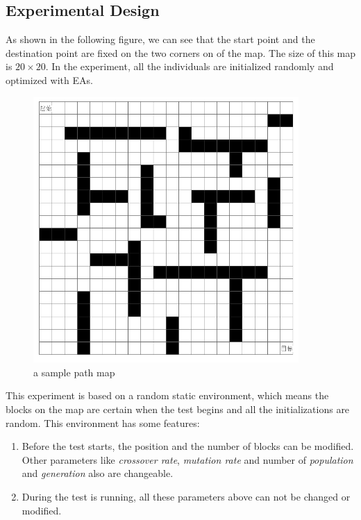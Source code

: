 \documentclass[a4paper, 11pt]{article}
\begin{document}
\subsection{Experimental Design}
As shown in the following figure, we can see that the start point and the destination point are fixed on the two corners on of the map. The size of this map is $20\times 20$. In the experiment, all the individuals are initialized randomly and optimized with EAs.
\begin{figure}[htb]
\includegraphics[width=0.9\textwidth]{images/20131122155512.png}
\caption{a sample path map}
\label{fig:path}
\end{figure}
This experiment is based on a random static environment, which means the blocks on the map are certain when the test begins and all the initializations are random. This environment has some features:

\begin{enumerate}[~~1)~]
\item Before the test starts, the position and the number of blocks can be modified.
    Other parameters like \emph{crossover rate}, \emph{mutation rate} and number of \emph{population} and \emph{generation} also are changeable.
\item During the test is running, all these parameters above can not be changed or modified.
\end{enumerate}

\end{document}
